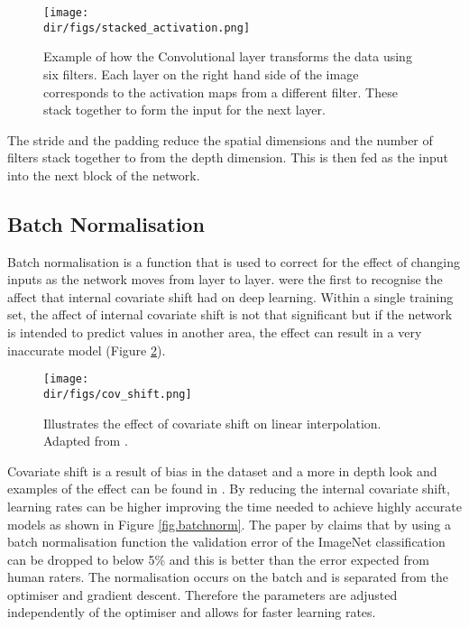\begin{figure}[htbp]
    \centering
    \texttt{[image: \\dir/figs/stacked\_activation.png]}
    \caption[Example of how the Convolutional layer transforms the data using six filters]{Example of how the Convolutional layer transforms the data using six filters. Each layer on the right hand side of the image corresponds to the activation maps from a different filter. These stack together to form the input for the next layer.}
    \label{fig.conv_filter}
\end{figure}

The stride and the padding reduce the spatial dimensions and the number of filters stack together to from the depth dimension. This is then fed as the input into the next block of the network.

\subsection{Batch Normalisation}
Batch normalisation is a function that is used to correct for the effect of changing inputs as the network moves from layer to layer. \citet{ioffe15} were the first to recognise the affect that internal covariate shift had on deep learning. Within a single training set, the affect of internal covariate shift is not that significant but if the network is intended to predict values in another area, the effect can result in a very inaccurate model (Figure \ref{fig.cov_shift}). 
\begin{figure}[htbp]
    \centering
    \texttt{[image: \\dir/figs/cov\_shift.png]}
    \caption[The effect of Covariate shift on a linear extrapolation]{Illustrates the effect of covariate shift on linear interpolation. Adapted from \cite{sugiyama08}.}
    \label{fig.cov_shift}
\end{figure}
Covariate shift is a result of bias in the dataset and a more in depth look and examples of the effect can be found in \citet{smola11}. By reducing the internal covariate shift, learning rates can be higher improving the time needed to achieve highly accurate models as shown in Figure \ref{fig.batchnorm}. The paper by \citet{ioffe15} claims that by using a batch normalisation function the validation error of the ImageNet classification can be dropped to below 5\% and this is better than the error expected from human raters. The normalisation occurs on the batch and is separated from the optimiser and gradient descent. Therefore the parameters are adjusted independently of the optimiser and allows for faster learning rates. \par

